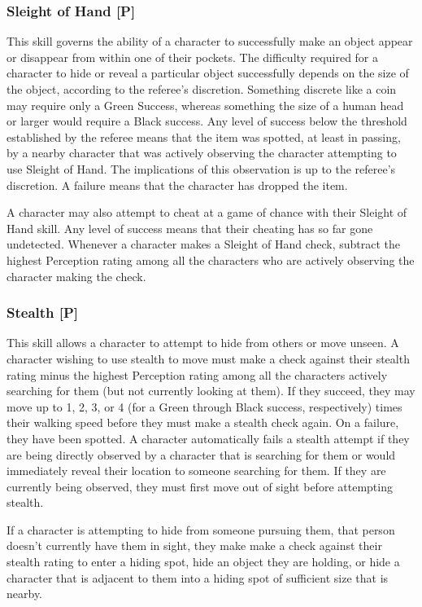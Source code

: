 \documentclass[oneside]{book}
\begin{document}
\begin{multicols}{2}
\subsubsection{Sleight of Hand [P]}
This skill governs the ability of a character to successfully make an object appear or disappear from within one of their pockets. The difficulty required for a character to hide or reveal a particular object successfully depends on the size of the object, according to the referee's discretion. Something discrete like a coin may require only a Green Success, whereas something the size of a human head or larger would require a Black success. Any level of success below the threshold established by the referee means that the item was spotted, at least in passing, by a nearby character that was actively observing the character attempting to use Sleight of Hand. The implications of this observation is up to the referee's discretion. A failure means that the character has dropped the item. 

A character may also attempt to cheat at a game of chance with their Sleight of Hand skill. Any level of success means that their cheating has so far gone undetected. 
Whenever a character makes a Sleight of Hand check, subtract the highest Perception rating among all the characters who are actively observing the character making the check. 

\subsubsection{Stealth [P]}
This skill allows a character to attempt to hide from others or move unseen. A character wishing to use stealth to move must make a check against their stealth rating minus the highest Perception rating among all the characters actively searching for them (but not currently looking at them). If they succeed, they may move up to 1, 2, 3, or 4 (for a Green through Black success, respectively) times their walking speed before they must make a stealth check again. On a failure, they have been spotted. A character automatically fails a stealth attempt if they are being directly observed by a character that is searching for them or would immediately reveal their location to someone searching for them. If they are currently being observed, they must first move out of sight before attempting stealth. 

If a character is attempting to hide from someone pursuing them, that person doesn't currently have them in sight, they make make a check against their stealth rating to enter a hiding spot, hide an object they are holding, or hide a character that is adjacent to them into a hiding spot of sufficient size that is nearby.


\end{multicols}
\end{document}
